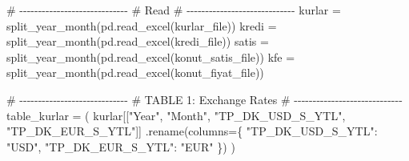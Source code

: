 \documentclass[
  11pt,
  a4paper,
]{article}
\newenvironment{Shaded}{\begin{snugshade}}{\end{snugshade}}
\newcommand{\CommentTok}[1]{\textcolor[rgb]{0.37,0.37,0.37}{#1}}
\newcommand{\NormalTok}[1]{\textcolor[rgb]{0.00,0.23,0.31}{#1}}
\newcommand{\OperatorTok}[1]{\textcolor[rgb]{0.37,0.37,0.37}{#1}}
\newcommand{\StringTok}[1]{\textcolor[rgb]{0.13,0.47,0.30}{#1}}
\begin{document}
\begin{Shaded}
\begin{Highlighting}[]
\CommentTok{\# {-}{-}{-}{-}{-}{-}{-}{-}{-}{-}{-}{-}{-}{-}{-}{-}{-}{-}{-}{-}{-}{-}{-}{-}{-}{-}{-}{-}{-}}
\CommentTok{\# Read}
\CommentTok{\# {-}{-}{-}{-}{-}{-}{-}{-}{-}{-}{-}{-}{-}{-}{-}{-}{-}{-}{-}{-}{-}{-}{-}{-}{-}{-}{-}{-}{-}}
\NormalTok{kurlar }\OperatorTok{=}\NormalTok{ split\_year\_month(pd.read\_excel(kurlar\_file))}
\NormalTok{kredi }\OperatorTok{=}\NormalTok{ split\_year\_month(pd.read\_excel(kredi\_file))}
\NormalTok{satis }\OperatorTok{=}\NormalTok{ split\_year\_month(pd.read\_excel(konut\_satis\_file))}
\NormalTok{kfe }\OperatorTok{=}\NormalTok{ split\_year\_month(pd.read\_excel(konut\_fiyat\_file))}

\CommentTok{\# {-}{-}{-}{-}{-}{-}{-}{-}{-}{-}{-}{-}{-}{-}{-}{-}{-}{-}{-}{-}{-}{-}{-}{-}{-}{-}{-}{-}{-}}
\CommentTok{\# TABLE 1: Exchange Rates}
\CommentTok{\# {-}{-}{-}{-}{-}{-}{-}{-}{-}{-}{-}{-}{-}{-}{-}{-}{-}{-}{-}{-}{-}{-}{-}{-}{-}{-}{-}{-}{-}}
\NormalTok{table\_kurlar }\OperatorTok{=}\NormalTok{ (}
\NormalTok{    kurlar[[}\StringTok{"Year"}\NormalTok{, }\StringTok{"Month"}\NormalTok{, }\StringTok{"TP\_DK\_USD\_S\_YTL"}\NormalTok{, }\StringTok{"TP\_DK\_EUR\_S\_YTL"}\NormalTok{]]}
\NormalTok{    .rename(columns}\OperatorTok{=}\NormalTok{\{}
        \StringTok{"TP\_DK\_USD\_S\_YTL"}\NormalTok{: }\StringTok{"USD"}\NormalTok{,}
        \StringTok{"TP\_DK\_EUR\_S\_YTL"}\NormalTok{: }\StringTok{"EUR"}
\NormalTok{    \})}
\NormalTok{)}


\end{Highlighting}
\end{Shaded}
\end{document}
